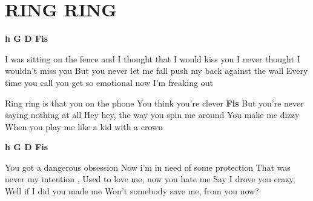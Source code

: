 \documentclass[../../../songbook.tex]{subfiles}
\begin{document}
\TabPositions{10cm} %
\section*{RING RING}
{}
\vspace{0.5cm}
{\color{red}\textbf{h G D Fis} } \newline
                                      
I was sitting on the fence and I thought that I would kiss you		  \newline                     
I never thought I wouldn’t miss you					                 \newline
But you never let me fall push my back against the wall				 \newline                       
Every time you call you get so emotional now I’m freaking out		 \newline

\-\hspace{1cm} Ring ring is that you on the phone			 \newline
\-\hspace{1cm} You think you’re clever						\tab    
{\color{red}\textbf{Fis} } \newline
\-\hspace{1cm} But you’re never saying nothing at all		\newline
\-\hspace{1cm} Hey hey, the way you spin me around			 \newline
\-\hspace{1cm} You make me dizzy							 \newline
\-\hspace{1cm} When you play me like a kid with a crown		\newline

{\color{red}\textbf{h G D Fis} } \newline
                              
You got a dangerous obsession Now i'm in need of some protection		\quad {} \newline                         
That was never my intention , Used to love me, now you hate me			\quad {} \newline          
Say I drove you crazy, Well if I did you made me						\tab \quad \quad   {\color{red}\textbf{Fis G} } \newline
Won’t somebody save me, from you now?									\tab  \quad \quad  {\color{red}\textbf{Fis} } \newline
\end{document}

